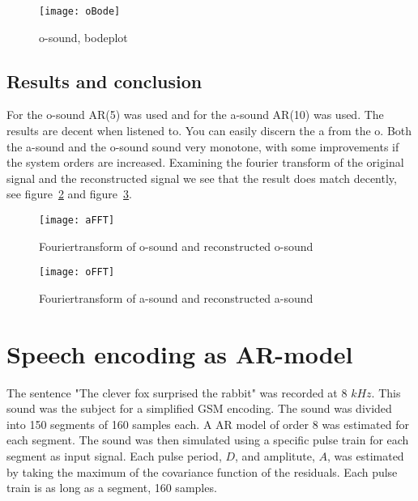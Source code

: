 \documentclass[10pt]{article}
\begin{document}
\begin{figure}[!hp]

    \begin{center}
      \texttt{[image: oBode]}
    \caption{o-sound, bodeplot \label{fig:oBode}}
    \end{center}
\end{figure}

\subsection{Results and conclusion}
For the o-sound AR(5) was used and for the a-sound AR(10) was used.
The results are decent when listened to. You can easily discern the a from the o.
Both the a-sound and the o-sound sound very monotone, with some improvements if
the system orders are increased.
Examining the fourier transform of the original signal and the reconstructed
signal we see that the result does match decently, see figure~\ref{fig:ffto} and
figure~\ref{fig:ffta}.


\begin{figure}[!hp]

    \begin{center}
      \texttt{[image: aFFT]}
    \caption{Fouriertransform of o-sound and reconstructed o-sound \label{fig:ffto}}
    \end{center}

\end{figure}

\begin{figure}[!hp]

    \begin{center}
      \texttt{[image: oFFT]}
    \caption{Fouriertransform of a-sound and reconstructed a-sound \label{fig:ffta}}
    \end{center}

\end{figure}



\section{Speech encoding as AR-model}
The sentence "The clever fox surprised the rabbit" was recorded at
8 $kHz$. This sound was the subject for a simplified GSM encoding.
The sound was divided into 150 segments of 160 samples each. A
AR model of order 8 was estimated for each segment. The sound was
then simulated using a specific pulse train for each segment as
input signal. Each pulse period, $D$, and amplitute, $A$, was
estimated by taking the maximum of the covariance function of the
residuals. Each pulse train is as long as a segment, 160 samples.
\end{document}
